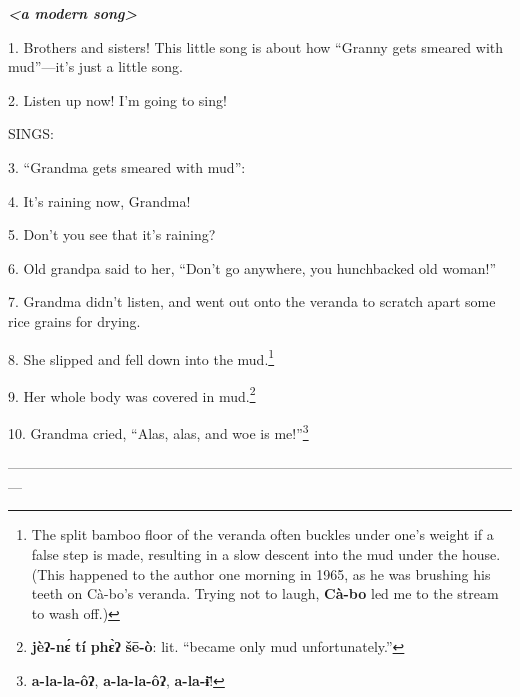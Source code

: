 \setcounter{footnote}{0}

\textit{\textbf{<a modern song>}}

1. Brothers and sisters! This little song is about how ``Granny gets smeared with
mud''---it's just a little song.

2. Listen up now! I'm going to sing!

SINGS:

3. ``Grandma gets smeared with mud'':

4. It's raining now, Grandma!

5. Don't you see that it's raining?

6. Old grandpa said to her, ``Don't go anywhere, you hunchbacked old woman!''

7. Grandma didn't listen, and went out onto the veranda to scratch apart some rice
grains for drying.

8. She slipped and fell down into the mud.\footnote{The split bamboo floor of the veranda often buckles under one's weight if a false step is made, resulting in a slow descent into the mud under the house. (This happened to the author one morning in 1965, as he was brushing his teeth on Cà-bo's veranda. Trying not to laugh, \textbf{Cà-bo} led me to the stream to wash off.)}

9. Her whole body was covered in mud.\footnote{\textbf{jèʔ-nɛ́} \textbf{tí} \textbf{phɛ̀ʔ} \textbf{šē-ò}: lit. ``became only mud unfortunately.''}

10. Grandma cried, ``Alas, alas, and woe is me!''\footnote{\textbf{a-la-la-ôʔ}, \textbf{a-la-la-ôʔ}, \textbf{a-la-ɨ̄}!}

---------------------------------------------------------------------------------------------------------------

